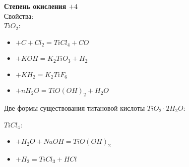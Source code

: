\textbf{Степень окисления $+4$} \\
Свойства: \\
$TiO_2$:
\begin{itemize}
	\item $+ C + Cl_2 = TiCl_4 + CO$
	\item $+ KOH = K_2TiO_3 + H_2 $
	\item $+ KH_2 = K_2TiF_6$
	\item $+ nH_2O = TiO(OH)_2 + H_2O	$	
\end{itemize}
Две формы существования титановой кислоты $TiO_2 \cdot 2H_2O$:
\begin{figure} [H]
	\centering {\texttt{[image: aa3]}}
\end{figure}
$TiCl_4$:
\begin{itemize}
	\item $+ H_2O + NaOH =TiO(OH)_2 $
	\item $+ H_2 = TiCl_3 + HCl$	
\end{itemize}
